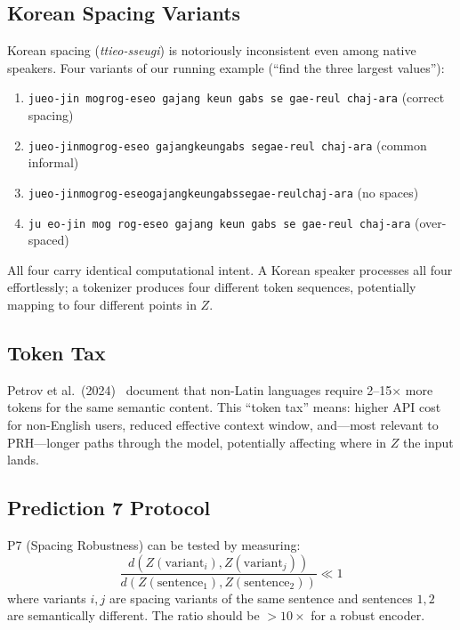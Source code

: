 \documentclass[11pt]{article}
\theoremstyle{definition}
\begin{document}
\subsection{Korean Spacing Variants}

Korean spacing (\emph{ttieo-sseugi}) is notoriously inconsistent even among native speakers. Four variants of our running example (``find the three largest values''):

\begin{enumerate}[nosep]
  \item \texttt{jueo-jin mogrog-eseo gajang keun gabs se gae-reul chaj-ara} (correct spacing)
  \item \texttt{jueo-jinmogrog-eseo gajangkeungabs segae-reul chaj-ara} (common informal)
  \item \texttt{jueo-jinmogrog-eseogajangkeungabssegae-reulchaj-ara} (no spaces)
  \item \texttt{ju eo-jin mog rog-eseo gajang keun gabs se gae-reul chaj-ara} (over-spaced)
\end{enumerate}

All four carry identical computational intent. A Korean speaker processes all four effortlessly; a tokenizer produces four different token sequences, potentially mapping to four different points in $Z$.

\subsection{Token Tax}

Petrov et al.\ (2024)~\cite{petrov2024tokenizers} document that non-Latin languages require 2--15$\times$ more tokens for the same semantic content. This ``token tax'' means: higher API cost for non-English users, reduced effective context window, and---most relevant to PRH---longer paths through the model, potentially affecting where in $Z$ the input lands.

\subsection{Prediction 7 Protocol}

P7 (Spacing Robustness) can be tested by measuring:
\[
\frac{d(Z(\text{variant}_i), Z(\text{variant}_j))}{d(Z(\text{sentence}_1), Z(\text{sentence}_2))} \ll 1
\]
where variants $i,j$ are spacing variants of the same sentence and sentences $1,2$ are semantically different. The ratio should be $> 10\times$ for a robust encoder.
\end{document}
